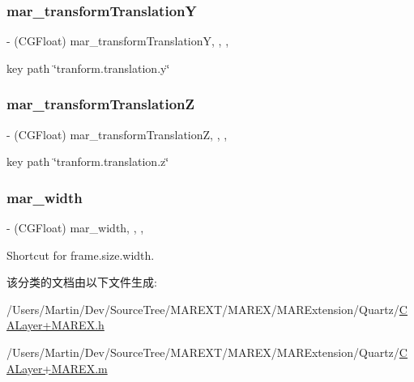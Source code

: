 \subsubsection{\texorpdfstring{mar\+\_\+transform\+TranslationY}{mar\_transformTranslationY}}
{\footnotesize\ttfamily -\/ (C\+G\+Float) mar\+\_\+transform\+TranslationY\hspace{0.3cm}{\ttfamily [read]}, {\ttfamily [write]}, {\ttfamily [nonatomic]}, {\ttfamily [assign]}}



key path \char`\"{}tranform.\+translation.\+y\char`\"{} 

\mbox{\label{category_c_a_layer_07_m_a_r_e_x_08_abc298f91e907a5d52adacb7c4f8115ac}} 
\subsubsection{\texorpdfstring{mar\+\_\+transform\+TranslationZ}{mar\_transformTranslationZ}}
{\footnotesize\ttfamily -\/ (C\+G\+Float) mar\+\_\+transform\+TranslationZ\hspace{0.3cm}{\ttfamily [read]}, {\ttfamily [write]}, {\ttfamily [nonatomic]}, {\ttfamily [assign]}}



key path \char`\"{}tranform.\+translation.\+z\char`\"{} 

\mbox{\label{category_c_a_layer_07_m_a_r_e_x_08_af7180b908e7a9c9993072170e7323bd1}} 
\subsubsection{\texorpdfstring{mar\+\_\+width}{mar\_width}}
{\footnotesize\ttfamily -\/ (C\+G\+Float) mar\+\_\+width\hspace{0.3cm}{\ttfamily [read]}, {\ttfamily [write]}, {\ttfamily [nonatomic]}, {\ttfamily [assign]}}



Shortcut for frame.\+size.\+width. 



该分类的文档由以下文件生成\+:\begin{DoxyCompactItemize}
\item 
/\+Users/\+Martin/\+Dev/\+Source\+Tree/\+M\+A\+R\+E\+X\+T/\+M\+A\+R\+E\+X/\+M\+A\+R\+Extension/\+Quartz/\hyperlink{_c_a_layer_09_m_a_r_e_x_8h}{C\+A\+Layer+\+M\+A\+R\+E\+X.\+h}\item 
/\+Users/\+Martin/\+Dev/\+Source\+Tree/\+M\+A\+R\+E\+X\+T/\+M\+A\+R\+E\+X/\+M\+A\+R\+Extension/\+Quartz/\hyperlink{_c_a_layer_09_m_a_r_e_x_8m}{C\+A\+Layer+\+M\+A\+R\+E\+X.\+m}\end{DoxyCompactItemize}
